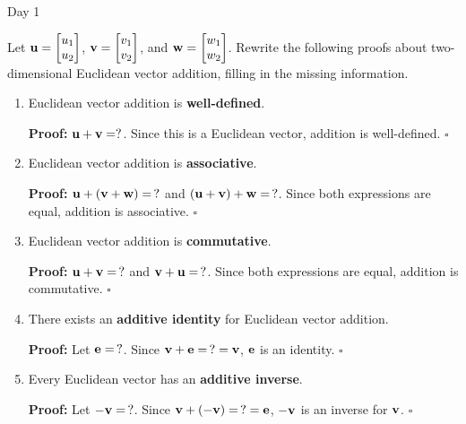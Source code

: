 
\begin{applicationActivities}{Day 1}

\begin{activity}{15}
Let \(\mathbf u=\begin{bmatrix} u_1 \\ u_2 \end{bmatrix}\),
\(\mathbf v=\begin{bmatrix} v_1 \\ v_2 \end{bmatrix}\), and
\(\mathbf w=\begin{bmatrix} w_1 \\ w_2 \end{bmatrix}\).
Rewrite the following proofs about two-dimensional Euclidean vector addition,
filling in the missing information.
\begin{enumerate}
  \item Euclidean vector addition is \textbf{well-defined}.

        \textbf{Proof:} \(\mathbf u+\mathbf v=?\). Since this is a Euclidean
        vector, addition is well-defined. \(\square\)
  \item Euclidean vector addition is \textbf{associative}.

        \textbf{Proof:} \(\mathbf u+(\mathbf v+\mathbf w)=\,?\) and
        \((\mathbf u+\mathbf v)+\mathbf w=\,?\). Since both expressions are equal,
        addition is associative. \(\square\)
  \item Euclidean vector addition is \textbf{commutative}.

        \textbf{Proof:} \(\mathbf u+\mathbf v=\,?\) and
        \(\mathbf v+\mathbf u=\,?\). Since both expressions are equal,
        addition is commutative. \(\square\)
  \item There exists an \textbf{additive identity} for Euclidean vector
        addition.

        \textbf{Proof:} Let \(\mathbf e=\,?\). Since
        \(\mathbf v+\mathbf e=\,?=\mathbf v\), \(\mathbf e\) is an identity. \(\square\)
  \item Every Euclidean vector has an \textbf{additive inverse}.

        \textbf{Proof:} Let \(-\mathbf v=\,?\). Since
        \(\mathbf v+(-\mathbf v)=\,?=\mathbf e\), \(-\mathbf v\) is an inverse
        for \(\mathbf v\). \(\square\)
\end{enumerate}
\end{activity}


\end{applicationActivities}

